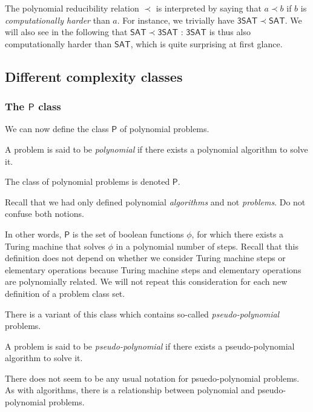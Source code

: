 The polynomial reducibility relation $ \prec $ is interpreted by saying that $ a \prec b $ if $ b $ is \textit{computationally harder} than $ a $. For instance, we trivially have $ \mathsf{3SAT} \prec \mathsf{SAT} $. We will also see in the following that $ \mathsf{SAT} \prec \mathsf{3SAT} $ : $ \mathsf{3SAT} $ is thus also computationally harder than $ \mathsf{SAT} $, which is quite surprising at first glance.

\subsection{Different complexity classes}

\subsubsection{The $ \mathsf P $ class}

We can now define the class $ \mathsf P $ of polynomial problems.

\begin{definition}
    A problem is said to be \textit{polynomial} if there exists a polynomial algorithm to solve it.

    The class of polynomial problems is denoted $ \mathsf P $.
\end{definition}

Recall that we had only defined polynomial \textit{algorithms} and not \textit{problems}. Do not confuse both notions.

In other words, $ \mathsf P $ is the set of boolean functions $ \phi $, for which there exists a Turing machine that solves $ \phi $ in a polynomial number of steps. Recall that this definition does not depend on whether we consider Turing machine steps or elementary operations because Turing machine steps and elementary operations are polynomially related. We will not repeat this consideration for each new definition of a problem class set.

There is a variant of this class which contains so-called \textit{pseudo-polynomial} problems.

\begin{definition}
    A problem is said to be \textit{pseudo-polynomial} if there exists a pseudo-polynomial algorithm to solve it.
\end{definition}

There does not seem to be any usual notation for psuedo-polynomial problems. As with algorithms, there is a relationship between polynomial and pseudo-polynomial problems.

